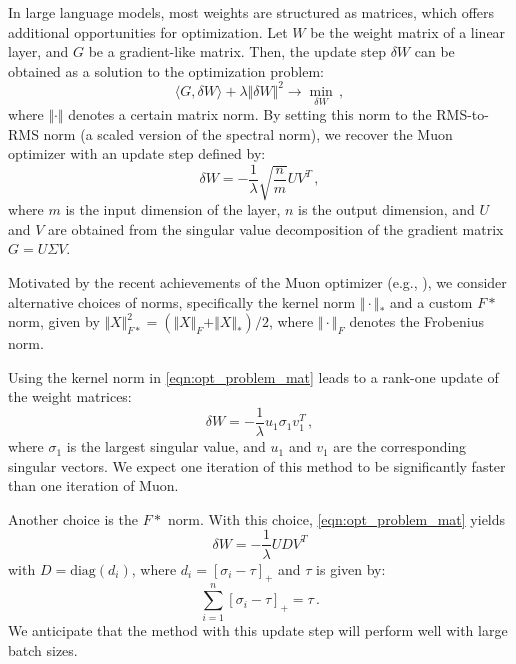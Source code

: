 \documentclass[]{scrartcl}
\newcommand{\norm}[1]{\Vert{#1}\Vert}
\begin{document}
In large language models, most weights are structured as matrices, which offers additional opportunities for optimization. Let $W$ be the weight matrix of a linear layer, and $G$ be a gradient-like matrix. Then, the update step $\delta W$ can be obtained as a solution to the optimization problem:
\begin{equation}\label{eqn:opt_problem_mat}
  \langle G, \delta W \rangle + \lambda \norm{\delta W}^2 \to \min_{\delta W}\,,
\end{equation}
where $\norm{\cdot}$ denotes a certain matrix norm. By setting this norm to the RMS-to-RMS norm (a scaled version of the spectral norm), we recover the Muon optimizer \cite{bernstein2025deriving, bernstein2024oldoptimizernewnorm} with an update step defined by:
\begin{equation}\label{eqn:update_muon}
\delta W = - \frac{1}{\lambda}\sqrt{\frac{n}{m}}UV^T\,,
\end{equation}
where $m$ is the input dimension of the layer, $n$ is the output dimension, and $U$ and $V$ are obtained from the singular value decomposition of the gradient matrix $G = U \Sigma V$.

Motivated by the recent achievements of the Muon optimizer (e.g., \cite{liu2025muon}), we consider alternative choices of norms, specifically the kernel norm $\norm{\cdot}_*$ and a custom $F*$ norm, given by $\norm{X}_{F*}^2 = (\norm{X}_F + \norm{X}_*)/2$, where $\norm{\cdot}_F$ denotes the Frobenius norm.

Using the kernel norm in \eqref{eqn:opt_problem_mat} leads to a rank-one update of the weight matrices:
\begin{equation}\label{eqn:update_star}
  \delta W = -\frac{1}{\lambda} u_1 \sigma_1 v_1^T\,,
\end{equation}
where $\sigma_1$ is the largest singular value, and $u_1$ and $v_1$ are the corresponding singular vectors. We expect one iteration of this method to be significantly faster than one iteration of Muon.

Another choice is the $F*$ norm. With this choice, \eqref{eqn:opt_problem_mat} yields 
\begin{equation}\label{eqn:update_F_star}
\delta W = -\frac{1}{\lambda}UDV^T
\end{equation} 
with $D = \text{diag}(d_i)$, where $d_i = [\sigma_i - \tau]_+$ and $\tau$ is given by:
\begin{equation}
    \sum_{i=1}^n [\sigma_i - \tau]_+ = \tau\,.
\end{equation}
We anticipate that the method with this update step will perform well with large batch sizes.
\end{document}

